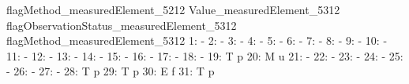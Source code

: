 \documentclass[nojss]{jss}
\begin{document}
\begin{Schunk}
\begin{Soutput}
     flagMethod_measuredElement_5212 Value_measuredElement_5312
     flagObservationStatus_measuredElement_5312 flagMethod_measuredElement_5312
  1:                                                                          -
  2:                                                                          -
  3:                                                                          -
  4:                                                                          -
  5:                                                                          -
  6:                                                                          -
  7:                                                                          -
  8:                                                                          -
  9:                                                                          -
 10:                                                                          -
 11:                                                                          -
 12:                                                                          -
 13:                                                                          -
 14:                                                                          -
 15:                                                                          -
 16:                                                                          -
 17:                                                                          -
 18:                                                                          -
 19:                                          T                               p
 20:                                          M                               u
 21:                                                                          -
 22:                                                                          -
 23:                                                                          -
 24:                                                                          -
 25:                                                                          -
 26:                                                                          -
 27:                                                                          -
 28:                                          T                               p
 29:                                          T                               p
 30:                                          E                               f
 31:                                          T                               p

\end{Soutput}
\end{Schunk}
\end{document}
